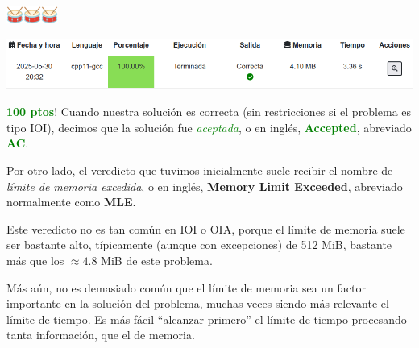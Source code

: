 \documentclass{beamer}
\begin{document}
    \begin{frame}[noframenumbering]
        \begin{center}
            \includegraphics[width=16pt]{drumroll.png}\includegraphics[width=16pt]{drumroll.png}\includegraphics[width=16pt]{drumroll.png}
        \end{center} \pause

        \begin{center}
            \includegraphics[width=.9\linewidth]{./ou_problem_ac_char.png}
        \end{center} \pause

        \textbf{\textcolor{green}{100 ptos}}! \pause Cuando nuestra solución es correcta (sin restricciones si el problema es tipo IOI), decimos que la solución fue \textit{\textcolor{green}{aceptada}}, o en inglés, \textbf{\textcolor{green}{Accepted}}, abreviado \textbf{\textcolor{green}{AC}}. \pause \vspace{4pt}

        Por otro lado, el veredicto que tuvimos inicialmente suele recibir el nombre de \textit{límite de memoria excedida}, o en inglés, \textbf{Memory Limit Exceeded}, abreviado normalmente como \textbf{MLE}. \pause

        Este veredicto no es tan común en IOI o OIA, porque el límite de memoria suele ser bastante alto, típicamente (aunque con excepciones) de 512 MiB, bastante más que los $\approx 4.8$ MiB de este problema. \pause 

        Más aún, no es demasiado común que el límite de memoria sea un factor importante en la solución del problema, muchas veces siendo más relevante el límite de tiempo. \pause Es más fácil ``alcanzar primero'' el límite de tiempo procesando tanta información, que el de memoria.
    \end{frame}
\end{document}

